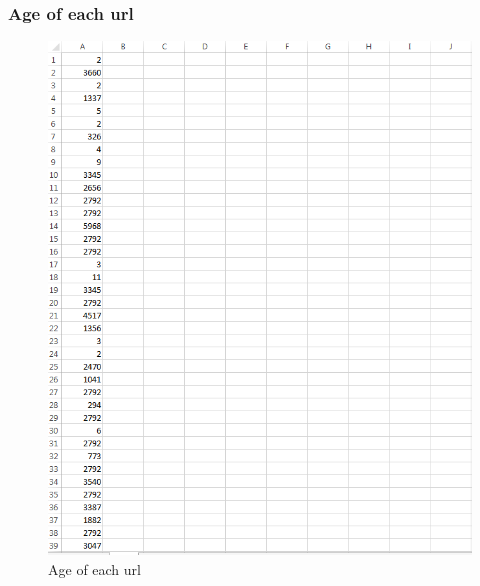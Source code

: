 \subsubsection{Age of each url}
\begin{figure}[ht]    
    \begin{center}
        \includegraphics[scale=0.80]{age_in_days.png}
        \caption{Age of each url}
        \label{Age of each url}
    \end{center}
\end{figure}
\newpage

